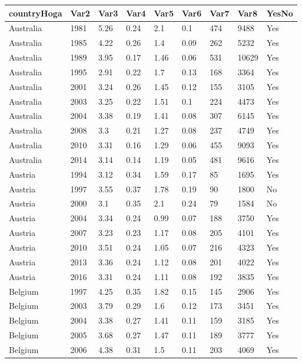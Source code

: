 \begin{tabular}{lllllllll}
countryHoga & Var2 & Var3 & Var4 & Var5 & Var6 & Var7 & Var8 & YesNo \\ 
\hline 
Australia & 1981 & 5.26 & 0.24 & 2.1 & 0.1 & 474 & 9488 & Yes \\ 
Australia & 1985 & 4.22 & 0.26 & 1.4 & 0.09 & 262 & 5232 & Yes \\ 
Australia & 1989 & 3.95 & 0.17 & 1.46 & 0.06 & 531 & 10629 & Yes \\ 
Australia & 1995 & 2.91 & 0.22 & 1.7 & 0.13 & 168 & 3364 & Yes \\ 
Australia & 2001 & 3.24 & 0.26 & 1.45 & 0.12 & 155 & 3105 & Yes \\ 
Australia & 2003 & 3.25 & 0.22 & 1.51 & 0.1 & 224 & 4473 & Yes \\ 
Australia & 2004 & 3.38 & 0.19 & 1.41 & 0.08 & 307 & 6145 & Yes \\ 
Australia & 2008 & 3.3 & 0.21 & 1.27 & 0.08 & 237 & 4749 & Yes \\ 
Australia & 2010 & 3.31 & 0.16 & 1.29 & 0.06 & 455 & 9093 & Yes \\ 
Australia & 2014 & 3.14 & 0.14 & 1.19 & 0.05 & 481 & 9616 & Yes \\ 
Austria & 1994 & 3.12 & 0.34 & 1.59 & 0.17 & 85 & 1695 & Yes \\ 
Austria & 1997 & 3.55 & 0.37 & 1.78 & 0.19 & 90 & 1800 & No \\ 
Austria & 2000 & 3.1 & 0.35 & 2.1 & 0.24 & 79 & 1584 & No \\ 
Austria & 2004 & 3.34 & 0.24 & 0.99 & 0.07 & 188 & 3750 & Yes \\ 
Austria & 2007 & 3.23 & 0.23 & 1.17 & 0.08 & 205 & 4101 & Yes \\ 
Austria & 2010 & 3.51 & 0.24 & 1.05 & 0.07 & 216 & 4323 & Yes \\ 
Austria & 2013 & 3.36 & 0.24 & 1.12 & 0.08 & 201 & 4022 & Yes \\ 
Austria & 2016 & 3.31 & 0.24 & 1.11 & 0.08 & 192 & 3835 & Yes \\ 
Belgium & 1997 & 4.25 & 0.35 & 1.82 & 0.15 & 145 & 2906 & Yes \\ 
Belgium & 2003 & 3.79 & 0.29 & 1.6 & 0.12 & 173 & 3451 & Yes \\ 
Belgium & 2004 & 3.38 & 0.27 & 1.41 & 0.11 & 159 & 3185 & Yes \\ 
Belgium & 2005 & 3.68 & 0.27 & 1.47 & 0.11 & 189 & 3777 & Yes \\ 
Belgium & 2006 & 4.38 & 0.31 & 1.5 & 0.11 & 203 & 4069 & Yes \\ 

\end{tabular}
